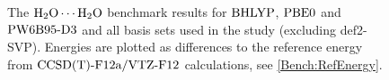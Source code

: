 \begin{figure}[b!]
\caption{The $\mbox{\ensuremath{\text H _2 \text O \cdots \text H _2 \text O}}$ benchmark results for $\text{BHLYP}$, $\text{PBE0}$ and $\text{PW6B95}\text{-D3}$ and all
basis sets used in the study (excluding \mbox{def2-SVP}). Energies are plotted as differences
to the reference energy from $\text{CCSD(T)-F12a}/\text{VTZ-F}12$ calculations, see \eqref{Bench:RefEnergy}.}
\label{Fig:Bench:H2O+H2O:BasisCompare}
\end{figure}


